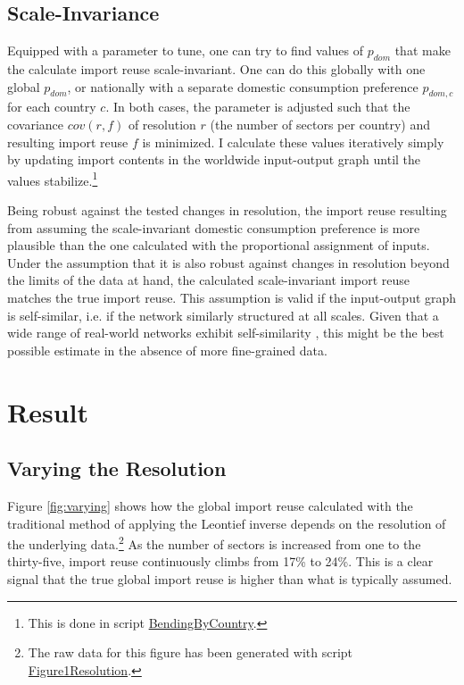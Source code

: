 \documentclass{paper}
\begin{document}
\subsection{Scale-Invariance}
\label{met:scale-invariance}
Equipped with a parameter to tune, one can try to find values of $p_{dom}$ that make the calculate import reuse scale-invariant. One can do this globally with one global $p_{dom}$, or nationally with a separate domestic consumption preference $p_{dom,c}$ for each country $c$. In both cases, the parameter is adjusted such that the covariance $cov(r, f)$ of resolution $r$ (the number of sectors per country) and resulting import reuse $f$ is minimized. I calculate these values iteratively simply by updating import contents in the worldwide input-output graph until the values stabilize.\footnote{This is done in script \href{https://github.com/kronrod/importreuse/blob/master/src/com/meissereconomics/seminar/run/BendingByCountry.java}{BendingByCountry}.}

Being robust against the tested changes in resolution, the import reuse resulting from assuming the scale-invariant domestic consumption preference is more plausible than the one calculated with the proportional assignment of inputs. Under the assumption that it is also robust against changes in resolution beyond the limits of the data at hand, the calculated scale-invariant import reuse matches the true import reuse. This assumption is valid if the input-output graph is self-similar, i.e. if the network similarly structured at all scales. Given that a wide range of real-world networks exhibit self-similarity \cite{song2005self}, this might be the best possible estimate in the absence of more fine-grained data.

\section{Result}
\label{sec:result}

\subsection{Varying the Resolution}
\label{res:varying}

Figure \ref{fig:varying} shows how the global import reuse calculated with the traditional method of applying the Leontief inverse depends on the resolution of the underlying data.\footnote{The raw data for this figure has been generated with script \href{https://github.com/kronrod/importreuse/blob/master/src/com/meissereconomics/seminar/run/Figure1Resolution.java}{Figure1Resolution}.} As the number of sectors is increased from one to the thirty-five, import reuse continuously climbs from 17\% to 24\%. This is a clear signal that the true global import reuse is higher than what is typically assumed.
\end{document}
